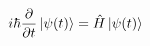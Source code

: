 \documentclass[preview]{standalone}
\begin{document}
\begin{align*}
i \hbar \frac{\partial}{\partial t} \ket{\psi(t)} = \hat{H} \ket{\psi(t)}
\end{align*}
\end{document}
